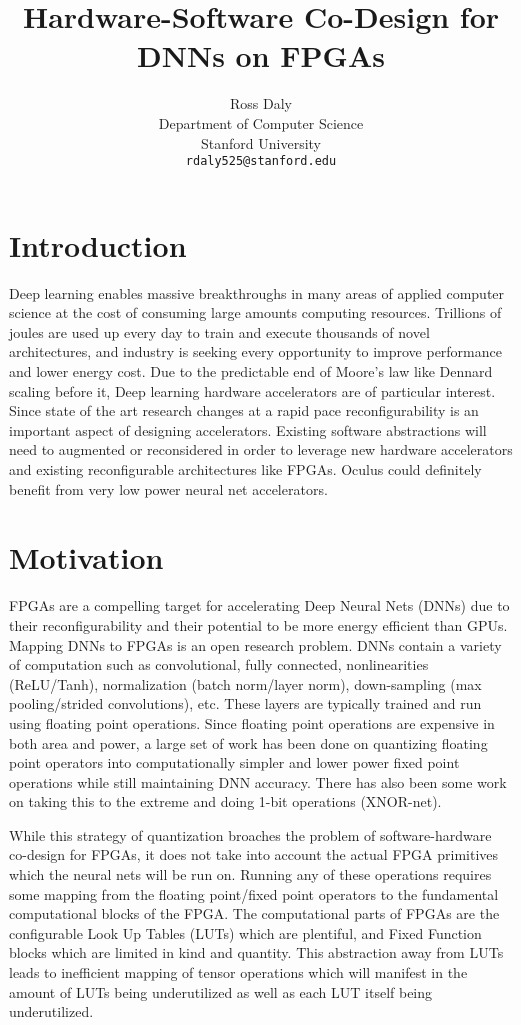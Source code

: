 \documentclass{article}
\title{Hardware-Software Co-Design for DNNs on FPGAs}
\author{
  Ross Daly\\
  Department of Computer Science\\
  Stanford University\\
  \texttt{rdaly525@stanford.edu} \\
}
\begin{document}

\maketitle

\section{Introduction}
Deep learning enables massive breakthroughs in many areas of applied computer science at the cost of consuming large amounts computing resources. Trillions of joules are used up every day to train and execute thousands of novel architectures, and industry is seeking every opportunity to improve performance and lower energy cost. Due to the predictable end of Moore’s law like Dennard scaling before it, Deep learning hardware accelerators are of particular interest. Since state of the art research changes at a rapid pace reconfigurability is an important aspect of designing accelerators. Existing software abstractions will need to augmented or reconsidered in order to leverage new hardware accelerators and existing reconfigurable architectures like FPGAs. Oculus could definitely benefit from very low power neural net accelerators. 

\section{Motivation}
FPGAs are a compelling target for accelerating Deep Neural Nets (DNNs) due to their reconfigurability and their potential to be more energy efficient than GPUs. Mapping DNNs to FPGAs is an open research problem. DNNs contain a variety of computation such as convolutional, fully connected, nonlinearities (ReLU/Tanh), normalization (batch norm/layer norm), down-sampling (max pooling/strided convolutions), etc. These layers are typically trained and run using floating point operations. Since floating point operations are expensive in both area and power, a large set of work has been done on quantizing floating point operators into computationally simpler and lower power fixed point operations while still maintaining DNN accuracy. There has also been some work on taking this to the extreme and doing 1-bit operations (XNOR-net).

While this strategy of quantization broaches the problem of software-hardware co-design for FPGAs, it does not take into account the actual FPGA primitives which the neural nets will be run on. Running any of these operations requires some mapping from the floating point/fixed point operators to the fundamental computational blocks of the FPGA. The computational parts of FPGAs are the configurable Look Up Tables (LUTs) which are plentiful, and Fixed Function blocks which are limited in kind and quantity. 
This abstraction away from LUTs leads to inefficient mapping of tensor operations which will manifest in the amount of LUTs being underutilized as well as each LUT itself being underutilized. 
\end{document}
